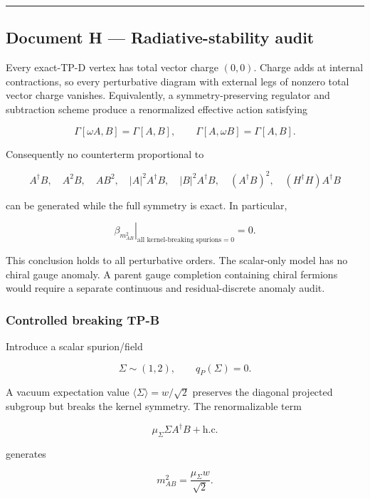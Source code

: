 \documentclass[
]{article}
\begin{document}
\begin{center}\rule{0.5\linewidth}{0.5pt}\end{center}

\hypertarget{document-h-radiative-stability-audit}{%
\subsection{Document H --- Radiative-stability
audit}\label{document-h-radiative-stability-audit}}

Every exact-TP-D vertex has total vector charge \((0,0)\). Charge adds
at internal contractions, so every perturbative diagram with external
legs of nonzero total vector charge vanishes. Equivalently, a
symmetry-preserving regulator and subtraction scheme produce a
renormalized effective action satisfying

\[
\Gamma[\omega A,B]=\Gamma[A,B],\qquad
\Gamma[A,\omega B]=\Gamma[A,B].
\]

Consequently no counterterm proportional to

\[
A^\dagger B,\quad A^2B,\quad AB^2,
\quad |A|^2A^\dagger B,\quad |B|^2A^\dagger B,
\quad(A^\dagger B)^2,
\quad(H^\dagger H)A^\dagger B
\]

can be generated while the full symmetry is exact. In particular,

\[
\left.\beta_{m_{AB}^2}\right|_{\text{all kernel-breaking spurions}=0}=0.
\]

This conclusion holds to all perturbative orders. The scalar-only model
has no chiral gauge anomaly. A parent gauge completion containing chiral
fermions would require a separate continuous and residual-discrete
anomaly audit.

\hypertarget{controlled-breaking-tp-b}{%
\subsubsection{Controlled breaking
TP-B}\label{controlled-breaking-tp-b}}

Introduce a scalar spurion/field

\[
\Sigma\sim(1,2),\qquad q_P(\Sigma)=0.
\]

A vacuum expectation value \(\langle\Sigma\rangle=w/\sqrt2\) preserves
the diagonal projected subgroup but breaks the kernel symmetry. The
renormalizable term

\[
\mu_\Sigma\Sigma A^\dagger B+\mathrm{h.c.}
\]

generates

\[
m_{AB}^2=\frac{\mu_\Sigma w}{\sqrt2}.
\]
\end{document}
